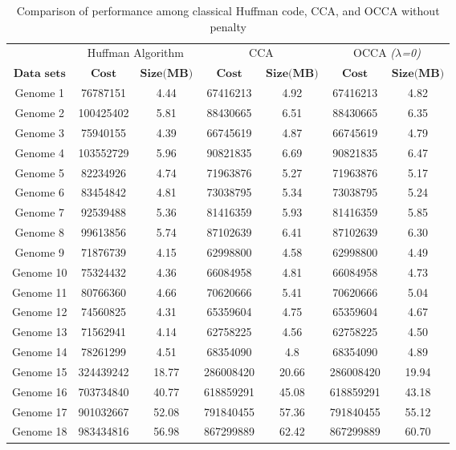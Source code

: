\documentclass{singlecol-new}
\theoremstyle{TH}{
\newtheorem{lemma}{Lemma}
\newtheorem{theorem}[lemma]{Theorem}
\newtheorem{corrolary}[lemma]{Corrolary}
\newtheorem{conjecture}[lemma]{Conjecture}
\newtheorem{proposition}[lemma]{Proposition}
\newtheorem{claim}[lemma]{Claim}
\newtheorem{stheorem}[lemma]{Wrong Theorem}
}
\theoremstyle{THrm}{
\newtheorem{definition}{Definition}
\newtheorem{question}{Question}
\newtheorem{remark}{Remark}
\newtheorem{scheme}{Scheme}
}
\theoremstyle{THhit}{
\newtheorem{case}{Case}[section]
}
\begin{document}
\begin{table}[!thpb]
\renewcommand{\arraystretch}{1.2}
\small
\label{table4}
\caption{Comparison of performance among classical Huffman code, CCA, and OCCA without penalty}

\begin{tabular}{c  c  c  c  c  c  c}
\toprule
 & \multicolumn{2}{c}{Huffman Algorithm} & \multicolumn{2}{c}{CCA }& \multicolumn{2}{c}{OCCA \textit{($\lambda$=0)}}\\%
$\textbf{Data sets}$ & $\textbf{Cost}$	& $\textbf{Size(MB)}$ &	$\textbf{Cost}$&	$\textbf{Size(MB)}$&$\textbf{Cost}$&	$\textbf{Size(MB)}$
\\\hline
Genome 1& 76787151  &	4.44	&67416213   & 4.92	& 67416213 & 4.82 \\%
Genome 2& 100425402 &  	5.81	& 88430665	& 6.51	& 88430665&  6.35 \\%
Genome 3& 75940155  &	4.39    &66745619	& 4.87&	66745619 & 4.79 \\%
Genome 4& 103552729 &	5.96    &90821835&	6.69 &	90821835  & 6.47\\%
Genome 5& 82234926  &	4.74	&71963876	& 5.27 &	71963876 &5.17 \\%
Genome 6& 83454842  &   4.81	&73038795	& 5.34	&73038795 & 5.24\\%
Genome 7& 92539488  &	5.36    &81416359   &5.93	&81416359 & 5.85\\%
Genome 8& 99613856  & 	5.74	&87102639   &6.41	&87102639&	6.30 \\%
Genome 9& 71876739  &	4.15    &62998800  &4.58 &	62998800 &	4.49 \\%
Genome 10& 75324432 & 	4.36	&66084958  &4.81	&66084958&	4.73 \\%
Genome 11& 80766360 &	4.66    &70620666  &5.41&	70620666&	5.04 \\%
Genome 12& 74560825 &	4.31    &65359604  &4.75	&65359604&	4.67\\%
Genome 13& 71562941 & 	4.14	&62758225  &4.56	&	62758225 &	4.50\\%
Genome 14& 78261299 & 	4.51    &68354090  &4.8&	68354090& 4.89  \\%
Genome 15& 324439242& 	18.77    &286008420 & 20.66	 &	286008420 &	19.94 \\%
Genome 16& 703734840&  40.77    &618859291 & 45.08  &	618859291 &	43.18 \\%
Genome 17& 901032667&  52.08    &791840455 &	57.36 &	791840455 &	55.12 \\%
Genome 18& 983434816&  56.98    &867299889 &	62.42 &	867299889 & 60.70 \\%

\bottomrule
\end{tabular}
\end{table}
\end{document}
